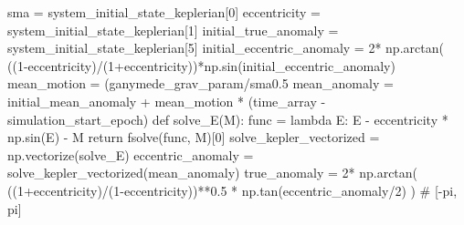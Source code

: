 {}
\markdownRendererSectionEnd \markdownRendererSectionBegin
{}\markdownRendererInterblockSeparator
{}
\markdownRendererSectionEnd \markdownRendererSectionBegin
{}\markdownRendererInterblockSeparator
{}
\markdownRendererSectionEnd \markdownRendererSectionBegin
{}\markdownRendererInterblockSeparator
{}sma = system_initial_state_keplerian[0] eccentricity = system_initial_state_keplerian[1] initial_true_anomaly = system_initial_state_keplerian[5] initial_eccentric_anomaly = 2* np.arctan( ((1-eccentricity)/(1+eccentricity))*np.sin(initial_eccentric_anomaly)\markdownRendererInterblockSeparator
{}
\markdownRendererSectionEnd \markdownRendererSectionBegin
{}\markdownRendererInterblockSeparator
{}
\markdownRendererSectionEnd \markdownRendererSectionBegin
{}\markdownRendererInterblockSeparator
{}mean_motion = (ganymede_grav_param/sma0.5 mean_anomaly = initial_mean_anomaly + mean_motion * (time_array - simulation_start_epoch)\markdownRendererInterblockSeparator
{}
\markdownRendererSectionEnd \markdownRendererSectionBegin
{}\markdownRendererInterblockSeparator
{}def solve_E(M): func = lambda E: E - eccentricity * np.sin(E) - M return fsolve(func, M)[0] solve_kepler_vectorized = np.vectorize(solve_E) eccentric_anomaly = solve_kepler_vectorized(mean_anomaly)\markdownRendererInterblockSeparator
{}
\markdownRendererSectionEnd \markdownRendererSectionBegin
{}\markdownRendererInterblockSeparator
{}true_anomaly = 2* np.arctan( ((1+eccentricity)/(1-eccentricity))**0.5 * np.tan(eccentric_anomaly/2) ) # [-pi, pi]\markdownRendererInterblockSeparator
{}
\markdownRendererSectionEnd \markdownRendererSectionBegin
{}\markdownRendererInterblockSeparator
{}
\markdownRendererSectionEnd \markdownRendererSectionBegin
{}\markdownRendererInterblockSeparator
